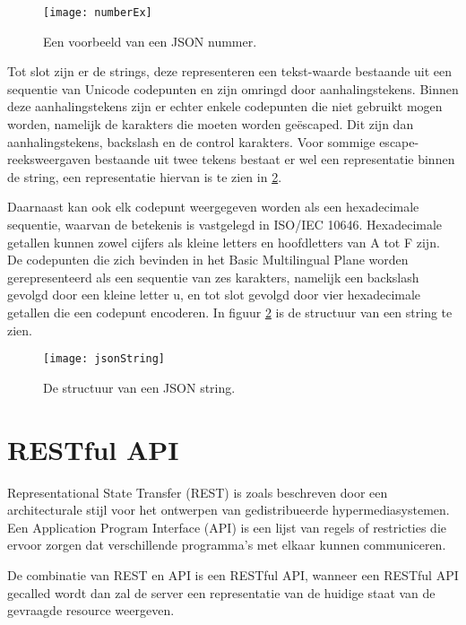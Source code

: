 \begin{figure}[H]
    \centering
    \texttt{[image: numberEx]}
    \caption[JSON Nummer]{Een voorbeeld van een JSON nummer.}
    \label{fig:numberEx}
\end{figure}

Tot slot zijn er de strings, deze representeren een tekst-waarde bestaande uit een sequentie van Unicode codepunten en zijn omringd door aanhalingstekens. Binnen deze aanhalingstekens zijn er echter enkele codepunten die niet gebruikt mogen worden, namelijk de karakters die moeten worden geëscaped. Dit zijn dan aanhalingstekens, backslash en de control karakters.
Voor sommige escape-reeksweergaven bestaande uit twee tekens bestaat er wel een representatie binnen de string, een representatie hiervan is te zien in \ref{fig:jsonString}.

Daarnaast kan ook elk codepunt weergegeven worden als een hexadecimale sequentie, waarvan de betekenis is vastgelegd in ISO/IEC 10646. Hexadecimale getallen kunnen zowel cijfers als kleine letters en hoofdletters van A tot F zijn.
De codepunten die zich bevinden in het Basic Multilingual Plane worden gerepresenteerd als een sequentie van zes karakters, namelijk een backslash gevolgd door een kleine letter u, en tot slot gevolgd door vier hexadecimale getallen die een codepunt encoderen. In figuur \ref{fig:jsonString} is de structuur van een string te zien.

\begin{figure}[H]
    \centering
    \texttt{[image: jsonString]}
    \caption[JSON String]{De structuur van een JSON string. \autocite{Crockford}}
    \label{fig:jsonString}
\end{figure}


\section{RESTful API}
\label{sec:RESTful API}

Representational State Transfer (REST) is zoals beschreven door \textcite{Fielding2000} een architecturale stijl voor het ontwerpen van gedistribueerde hypermediasystemen.
Een Application Program Interface (API) is een lijst van regels of restricties die ervoor zorgen dat verschillende programma's met elkaar kunnen communiceren. \autocite{Hubspire}

De combinatie van REST en API is een RESTful API, wanneer een RESTful API gecalled wordt dan zal de server een representatie van de huidige staat van de gevraagde resource weergeven.

